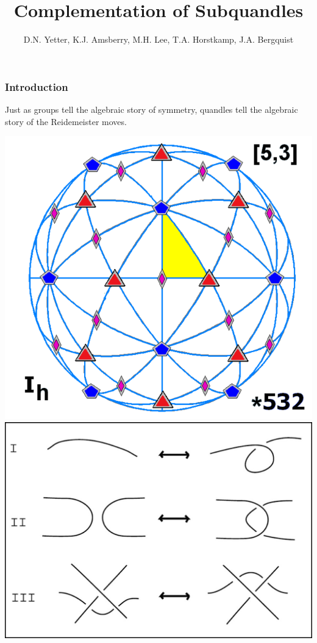 \documentclass[10pt]{beamer}
\title{Complementation of Subquandles}
\author{D.N. Yetter, K.J. Amsberry, M.H. Lee, T.A. Horstkamp, J.A. Bergquist}
\theoremstyle{plain}
\begin{document}
    \frame{
        \titlepage
    }

    \begin{frame}
        \frametitle{Introduction}

        Just as groups tell the algebraic story of symmetry, quandles tell the algebraic story of the Reidemeister moves.

        \includegraphics[scale = 0.75]{figures/symmetry.png}
        \includegraphics[scale = 0.75]{figures/reidemeisterMoves.jpg}


    \end{frame}
\end{document}
